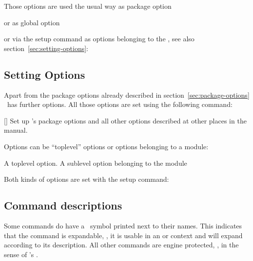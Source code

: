 \documentclass{xsim-manual}
\begin{document}
Those options are used the usual way as package option
\begin{sourcecode}
  \usepackage[verbose]{xsim}
\end{sourcecode}
or as global option
or via the setup command as options belonging to the
, see also section~\vref{sec:setting-options}:
\begin{sourcecode}
\end{sourcecode}

\subsection{Setting Options}\label{sec:setting-options}
Apart from the package options already described in
section~\vref{sec:package-options} \xsim\ has further options.  All those
options are set using the following command:
\begin{commands}
  []
    Set up \xsim's package options and all other options described at
    other places in the manual.
\end{commands}
Options can be \enquote{toplevel} options or options belonging to a module:
\begin{options}
    A toplevel option.
    A sublevel option belonging to the module 
\end{options}
Both kinds of options are set with the setup command:
\begin{sourcecode}
\end{sourcecode}

\subsection{Command descriptions}

Some commands do have a \expandablesymbol\ symbol printed next to their
names.  This indicates that the command is expandable, \ie, it is usable in an
 or  context and will expand according to its
description.  All other commands are engine protected, \ie, in the sense of
\eTeX's .
\end{document}
